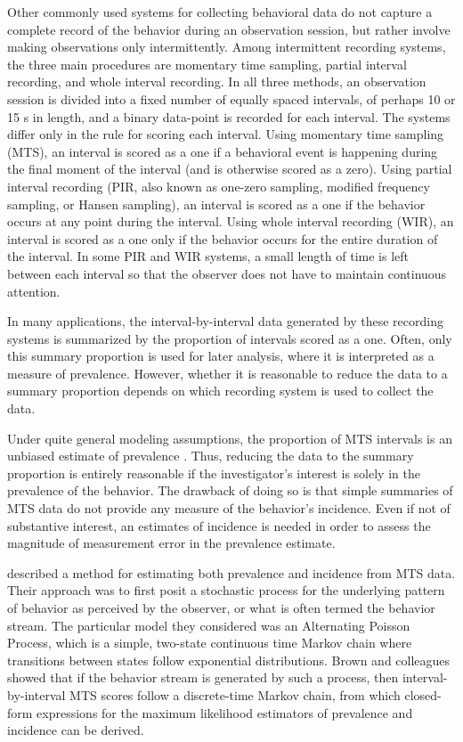 \documentclass[man, noextraspace, floatsintext]{apa6}\usepackage[]{graphicx}\usepackage[]{color}
\begin{document}
Other commonly used systems for collecting behavioral data do not capture a complete record of the behavior during an observation session, but rather involve making observations only intermittently. 
Among intermittent recording systems, the three main procedures are momentary time sampling, partial interval recording, and whole interval recording. 
In all three methods, an observation session is divided into a fixed number of equally spaced intervals, of perhaps 10 or 15 s in length, and a binary data-point is recorded for each interval. 
The systems differ only in the rule for scoring each interval. 
Using momentary time sampling (MTS), an interval is scored as a one if a behavioral event is happening during the final moment of the interval (and is otherwise scored as a zero). 
Using partial interval recording (PIR, also known as one-zero sampling, modified frequency sampling, or Hansen sampling), an interval is scored as a one if the behavior occurs at any point during the interval. 
Using whole interval recording (WIR), an interval is scored as a one only if the behavior occurs for the entire duration of the interval. 
In some PIR and WIR systems, a small length of time is left between each interval so that the observer does not have to maintain continuous attention. 

In many applications, the interval-by-interval data generated by these recording systems is summarized by the proportion of intervals scored as a one. 
Often, only this summary proportion is used for later analysis, where it is interpreted as a measure of prevalence. 
However, whether it is reasonable to reduce the data to a summary proportion depends on which recording system is used to collect the data. 

Under quite general modeling assumptions, the proportion of MTS intervals is an unbiased estimate of prevalence \citep{Rogosa1991statistical}. 
Thus, reducing the data to the summary proportion is entirely reasonable if the investigator's interest is solely in the prevalence of the behavior. 
The drawback of doing so is that simple summaries of MTS data do not provide any measure of the behavior's incidence. 
Even if not of substantive interest, an estimates of incidence is needed in order to assess the magnitude of measurement error in the prevalence estimate. 

\citet[see also \citealp{Griffin1983parametric}]{Brown1977estimation} described a method for estimating both prevalence and incidence from MTS data. 
Their approach was to first posit a stochastic process for the underlying pattern of behavior as perceived by the observer, or what is often termed the behavior stream. 
The particular model they considered was an Alternating Poisson Process, which is a simple, two-state continuous time Markov chain where transitions between states follow exponential distributions. 
Brown and colleagues showed that if the behavior stream is generated by such a process, then interval-by-interval MTS scores follow a discrete-time Markov chain, from which closed-form expressions for the maximum likelihood estimators of prevalence and incidence can be derived.
\end{document}
